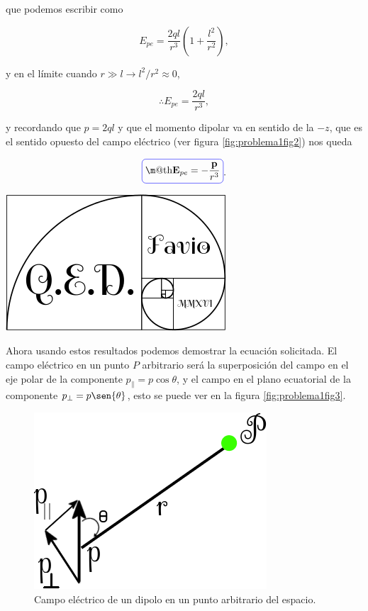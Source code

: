 \documentclass[a4paper,11pt]{article}
\makeatletter
\numberwithin{equation}{section}
\newcommand*{\boxcolor}{blue}
\renewcommand{\boxed}[1]{\textcolor{\boxcolor}{%
\tikz[baseline={([yshift=-1ex]current bounding box.center)}] \node [rectangle, minimum width=1ex,rounded corners,draw] {\normalcolor\m@th$\displaystyle#1$};}}
\makeatother
\begin{document}
que podemos escribir como 

\begin{equation}
 E_{pe} = \frac{2ql}{r^3}\left(1 + \frac{l^2}{r^2} \right),
\end{equation}

y en el límite cuando $r \gg l \rightarrow l^2/r^2 \approx 0$,

\begin{equation}
 \therefore E_{pe} = \frac{2ql}{r^3},
\end{equation}

y recordando que $p = 2ql$ y que el momento dipolar va en sentido de la $-z$, que 
es el sentido opuesto del campo eléctrico (ver figura \eqref{fig:problema1fig2}) nos queda 

\begin{equation}
 \boxed{\mathbf{E}_{pe} = - \frac{\mathbf{p}}{r^3}}.
 \label{eq:campoElecDipoloEcuador}
\end{equation}

\hspace{10cm}\includegraphics[scale=0.25]{logoQED}

\vspace{.2cm}

Ahora usando estos resultados podemos demostrar la ecuación solicitada. El campo 
eléctrico en un punto $P$ arbitrario será la superposición del campo en el eje polar 
de la componente $p_{\parallel} = p \cos{\theta}$, y el campo en el plano ecuatorial de la 
componente $p_{\bot} = p\sen{\theta}$, esto se puede ver en la figura 
\eqref{fig:problema1fig3}.

\begin{figure}[H]
 \center 
 \includegraphics[scale=0.5]{problema1fig3}
 \caption{Campo eléctrico de un dipolo en un punto arbitrario del espacio.}
 \label{fig:problema1fig3}
\end{figure}
\end{document}
